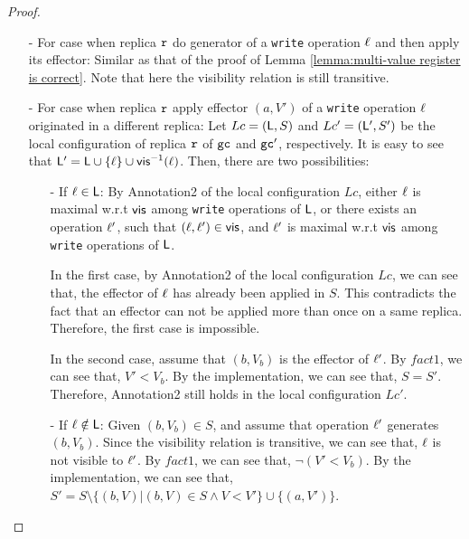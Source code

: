 \begin {proof}
\begin{itemize}
\setlength{\itemsep}{0.5pt}
\item[-] For case when replica $\mathtt{r}$ do generator of a {\tt write} operation $\ell$ and then apply its effector: Similar as that of the proof of Lemma \ref{lemma:multi-value register is correct}. Note that here the visibility relation is still transitive.

\item[-] For case when replica $\mathtt{r}$ apply effector $(a,V')$ of a {\tt write} operation $\ell$ originated in a different replica: Let $Lc = (\mathsf{L},S)$ and $Lc' = (\mathsf{L}',S')$ be the local configuration of replica $\mathtt{r}$ of $\mathtt{gc}$ and $\mathtt{gc}'$, respectively. It is easy to see that $\mathsf{L}' = \mathsf{L} \cup \{ \ell \} \cup \mathsf{vis}^{-1}(\ell)$. %
    Then, there are two possibilities:

    \begin{itemize}
    \setlength{\itemsep}{0.5pt}
    \item[-] If $\ell \in \mathsf{L}$: By Annotation2 of the local configuration $Lc$, either $\ell$ is maximal w.r.t $\mathsf{vis}$ among {\tt write} operations of $\mathsf{L}$, or there exists an operation $\ell'$, such that $(\ell,\ell') \in \mathsf{vis}$, and $\ell'$ is maximal w.r.t $\mathsf{vis}$ among {\tt write} operations of $\mathsf{L}$.

        In the first case, by Annotation2 of the local configuration $Lc$, we can see that, the effector of $\ell$ has already been applied in $S$. This contradicts the fact that an effector can not be applied more than once on a same replica. Therefore, the first case is impossible.

        In the second case, assume that $(b,V_b)$ is the effector of $\ell'$. By $fact1$, we can see that, $V' < V_b$. By the implementation, we can see that, $S = S'$. Therefore, Annotation2 still holds in the local configuration $Lc'$. 

    \item[-] If $\ell \notin \mathsf{L}$: Given $(b,V_b) \in S$, and assume that operation $\ell'$ generates $(b,V_b)$. Since the visibility relation is transitive, %
        we can see that, $\ell$ is not visible to $\ell'$. By $fact1$, we can see that, $\neg (V' < V_b)$. By the implementation, we can see that, $S' = S \setminus \{ (b,V) \vert (b,V) \in S \wedge V < V' \} \cup \{ (a,V') \}$.


\end{itemize}
\end{itemize}
\end{proof}
